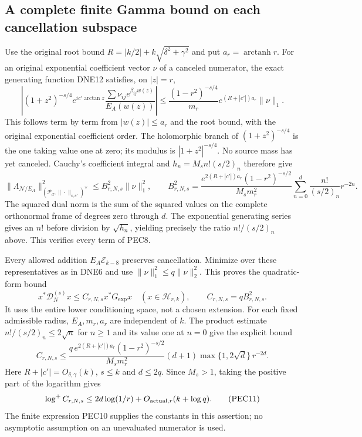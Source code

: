 \documentclass[11pt,a4paper]{article}
\begin{document}
\subsection{A complete finite Gamma bound on each cancellation subspace}
Use the original root bound $R=|k/2|+k\sqrt{\delta^2+\gamma^2}$
and put $a_r=\operatorname{arctanh}r$. For an original exponential
coefficient vector $\nu$ of a canceled numerator, the exact generating
function DNE12 satisfies, on $|z|=r$,
\[
\left|(1+z^2)^{-s/4}e^{ic'\arctan z}
          \frac{\sum\nu_{ij}e^{\beta_{ij}w(z)}}{E_A(w(z))}\right|
 \le \frac{(1-r^2)^{-s/4}}{m_r}
             e^{(R+|c'|)a_r}\|\nu\|_1 .
 \tag{PEC7}
\]
This follows term by term from $|w(z)|\le a_r$ and the root bound,
with the original exponential coefficient order. The holomorphic
branch of $(1+z^2)^{-s/4}$ is the one taking value one at zero;
its modulus is $|1+z^2|^{-s/4}$. No source mass has yet canceled.
Cauchy's coefficient integral and $h_n=M_sn!(s/2)_n$ therefore give
\[
 \|\Lambda_{\mathcal N/E_A}\|_{(\mathcal P_d,\|\cdot\|_{s,c'})^\vee}^2
 \le B_{r,N,s}^{2}\|\nu\|_1^2,\qquad
 B_{r,N,s}^{2}=
 \frac{e^{2(R+|c'|)a_r}(1-r^2)^{-s/2}}{M_sm_r^2}
 \sum_{n=0}^{d}\frac{n!}{(s/2)_n}r^{-2n}.
 \tag{PEC8}
\]
The squared dual norm is the sum of the squared values on the complete
orthonormal frame of degrees zero through $d$. The exponential generating
series gives an $n!$ before division by $\sqrt{h_n}$, yielding precisely
the ratio $n!/(s/2)_n$ above. This verifies every term of PEC8.

Every allowed addition $E_A\mathscr E_{k-8}$ preserves cancellation.
Minimize over these representatives as in DNE6 and use
$\|\nu\|_1^2\le q\|\nu\|_2^2$. This proves the quadratic-form bound
\[
 x^*\mathcal D_N^{(s)}x\le C_{r,N,s}x^*G_{\exp}x
 \quad(x\in\mathcal H_{r,k}),\qquad C_{r,N,s}=qB_{r,N,s}^{2}.
 \tag{PEC9}
\]
It uses the entire lower conditioning space, not a chosen extension.
For each fixed admissible radius, $E_A,m_r,a_r$ are independent of $k$.
The product estimate $n!/(s/2)_n\le2\sqrt n$ for $n\ge1$
and its value one at $n=0$ give the explicit bound
\[
 C_{r,N,s}\le
 \frac{q\,e^{2(R+|c'|)a_r}(1-r^2)^{-s/2}}{M_sm_r^2}
 (d+1)\max\{1,2\sqrt d\}\,r^{-2d}.
 \tag{PEC10}
\]
Here $R+|c'|=O_{\delta,\gamma}(k)$, $s\le k$ and $d\le2q$.
Since $M_s>1$, taking the positive part of the logarithm gives
\[
 \log^+ C_{r,N,s}\le 2d\log(1/r)
                    +O_{{\rm actual},r}(k+\log q).
 \tag{PEC11}
\]
The finite expression PEC10 supplies the constants in this assertion;
no asymptotic assumption on an unevaluated numerator is used.
\end{document}

